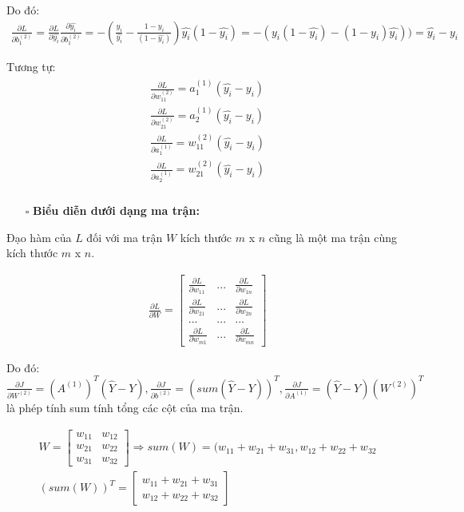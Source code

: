 Do đó:
\begin{align}
\frac{\partial L}{\partial b_1^{(2)}} = \frac{\partial L}{\partial\hat{y_i}} \frac {\partial\hat{y_i}}{\partial b_1^{(2)}} = - (\frac{y_i}{\hat{y_i}} - \frac{1-y_i}{(1-\hat{y_i})})  \hat{y_i}  (1-\hat{y_i}) = -(y_i  (1-\hat{y_i}) - (1-y_i)  \hat{y_i})) = \hat{y_i}-y_i
\end{align}

Tương tự:
\begin{align}
\begin{split}
\frac{\partial L}{\partial w_{11} ^ {(2)}} = a_1 ^ {(1)} (\hat{y_i}-y_i) \\
\frac{\partial L}{\partial w_{21} ^ {(2)}} = a_2 ^ {(1)} (\hat{y_i}-y_i) \\
\frac{\partial L}{\partial a_1 ^ {(1)}} =  w_{11} ^ {(2)}  (\hat{y_i}-y_i) \\
\frac{\partial L}{\partial a_2 ^ {(1)}} =  w_{21} ^ {(2)} (\hat{y_i}-y_i) \\
\end{split}
\end{align}

\begin{itemize}
\item[$\square$] \textbf{Biểu diễn dưới dạng ma trận:}
\end{itemize} 
Đạo hàm của $L$ đối với ma trận $W$ kích thước $m$ x $n$ cũng là một ma trận cùng kích thước $m$ x $n$.

\begin{align}
\frac{\partial L}{\partial W} =  \begin{bmatrix}\frac{\partial L}{\partial w_{11}}&...&\frac{\partial L}{\partial w_{1n}}\\
 \frac{\partial L}{\partial w_{21}}&...&\frac{\partial L}{\partial w_{2n}}\\
 ...&...&...\\\frac{\partial L}{\partial w_{m1}}&...&\frac{\partial L}{\partial w_{mn}}\end{bmatrix}
\end{align}

Do đó:
$
\frac{\partial J}{\partial W^{(2)}} = (A^{(1)})^T  (\hat{Y} - Y), \frac{\partial J}{\partial b^{(2)}} = (sum(\hat{Y} - Y))^T,  \frac{\partial J}{\partial A^{(1)}} = (\hat{Y} - Y)  (W^{(2)})^T
$
là phép tính sum tính tổng các cột của ma trận.

\begin{align}
W =   \begin{bmatrix}w_{11}&w_{12}\\w_{21}&w_{22}\\w_{31}&w_{32}\end{bmatrix}  \Longrightarrow sum(W) = (w_{11} + w_{21} + w_{31}, w_{12} + w_{22} + w_{32} \\
(sum(W))^T =  \begin{bmatrix}w_{11} + w_{21} + w_{31}\\w_{12} + w_{22} + w_{32}\end{bmatrix} 
\end{align}


